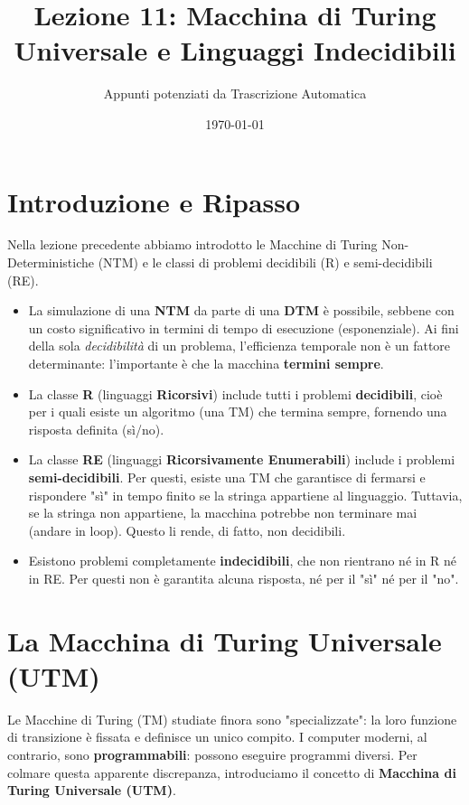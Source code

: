 \documentclass[a4paper]{article}
\title{Lezione 11: Macchina di Turing Universale e Linguaggi Indecidibili}
\author{Appunti potenziati da Trascrizione Automatica}
\date{\today}
\theoremstyle{remark} %
\begin{document}
\maketitle
\tableofcontents
\newpage

\section{Introduzione e Ripasso}

Nella lezione precedente abbiamo introdotto le Macchine di Turing Non-Deterministiche (NTM) e le classi di problemi decidibili (R) e semi-decidibili (RE).

\begin{itemize}
    \item La simulazione di una \textbf{NTM} da parte di una \textbf{DTM} è possibile, sebbene con un costo significativo in termini di tempo di esecuzione (esponenziale). Ai fini della sola \textit{decidibilità} di un problema, l'efficienza temporale non è un fattore determinante: l'importante è che la macchina \textbf{termini sempre}.
    \item La classe \textbf{R} (linguaggi \textbf{Ricorsivi}) include tutti i problemi \textbf{decidibili}, cioè per i quali esiste un algoritmo (una TM) che termina sempre, fornendo una risposta definita (sì/no).
    \item La classe \textbf{RE} (linguaggi \textbf{Ricorsivamente Enumerabili}) include i problemi \textbf{semi-decidibili}. Per questi, esiste una TM che garantisce di fermarsi e rispondere "sì" in tempo finito se la stringa appartiene al linguaggio. Tuttavia, se la stringa non appartiene, la macchina potrebbe non terminare mai (andare in loop). Questo li rende, di fatto, non decidibili.
    \item Esistono problemi completamente \textbf{indecidibili}, che non rientrano né in R né in RE. Per questi non è garantita alcuna risposta, né per il "sì" né per il "no".
\end{itemize}

\section{La Macchina di Turing Universale (UTM)}

Le Macchine di Turing (TM) studiate finora sono "specializzate": la loro funzione di transizione è fissata e definisce un unico compito. I computer moderni, al contrario, sono \textbf{programmabili}: possono eseguire programmi diversi. Per colmare questa apparente discrepanza, introduciamo il concetto di \textbf{Macchina di Turing Universale (UTM)}.
\end{document}

